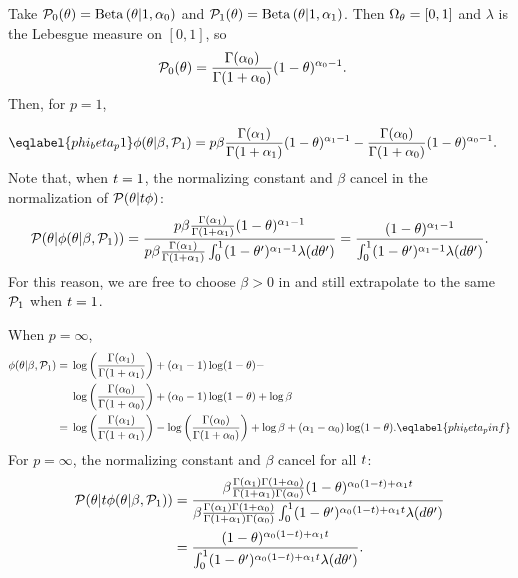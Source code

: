 \begin{ex}
%
Take $\mathcal{P}_{0}(\theta) = \mathrm{Beta}\left(\theta \vert 1, \alpha_0\right)$ and
$\mathcal{P}_{1}(\theta) = \mathrm{Beta}\left(\theta \vert 1, \alpha_1\right)$.  Then
$\Omega_{\theta}=[0,1]$ and $\lambda$ is the Lebesgue measure on $[0,1]$, so
%
\begin{align*}
%
\pbase(\theta) ={}&
    \frac{\Gamma(\alpha_0)}{\Gamma(1 + \alpha_0)} (1 - \theta)^{\alpha_0 - 1}.
%
\end{align*}
%
Then, for $p = 1$,

\begin{align}\eqlabel{phi_beta_p1}
%
\phi(\theta \vert \beta, \palt) ={}&
    p \beta \frac{\Gamma(\alpha_1)}{\Gamma(1 + \alpha_1)}
        (1 - \theta)^{\alpha_1 - 1} -
    \frac{\Gamma(\alpha_0)}{\Gamma(1 + \alpha_0)}
        (1 - \theta)^{\alpha_0 - 1}.
%
\end{align}
%
Note that, when $t = 1$, the normalizing constant and $\beta$ cancel in the
normalization of $\mathcal{P}(\theta \vert t \phi)$:
%
\begin{align*}
%
\p(\theta \vert \phi(\theta \vert \beta, \palt)) =
\frac{p \beta \frac{\Gamma(\alpha_1)}{\Gamma(1 + \alpha_1)}
        (1 - \theta)^{\alpha_1 - 1}}
     {p \beta \frac{\Gamma(\alpha_1)}{\Gamma(1 + \alpha_1)}
       \int_0^1 (1 - \theta')^{\alpha_1 - 1} \lambda(d\theta')}
=
\frac{(1 - \theta)^{\alpha_1 - 1}}
     {\int_0^1 (1 - \theta')^{\alpha_1 - 1} \lambda(d\theta')}.
%
\end{align*}
%
For this reason, we are free to choose $\beta > 0$ in 
and still extrapolate to the same $\mathcal{P}_{1}$ when $t = 1$.

When $p = \infty$,
%
\begin{align}
%
\phi(\theta \vert \beta, \palt) ={}&
    \log \left(
        \frac{\Gamma(\alpha_1) }{\Gamma(1 + \alpha_1)}
    \right)  + (\alpha_1 - 1) \log (1 - \theta) - \nonumber\\
{}&
    \log \left(
        \frac{\Gamma(\alpha_0)}{\Gamma(1 + \alpha_0)}
    \right) + (\alpha_0 - 1) \log (1 - \theta)  + \log \beta \nonumber\\
={}&
\log \left(
    \frac{\Gamma(\alpha_1) }{\Gamma(1 + \alpha_1)}
\right) -
\log \left(
    \frac{\Gamma(\alpha_0)}{\Gamma(1 + \alpha_0)}
\right) + \log \beta + (\alpha_1 - \alpha_0) \log(1 - \theta).
\eqlabel{phi_beta_pinf}
%
\end{align}
%
For $p = \infty$, the normalizing constant and $\beta$ cancel for all $t$:
%
\begin{align*}
%
\p(\theta \vert \t \phi(\theta \vert \beta, \palt)) ={}&
\frac{  \beta \frac{\Gamma(\alpha_1) \Gamma(1 + \alpha_0) }
                   {\Gamma(1 + \alpha_1) \Gamma(\alpha_0)}
        (1-\theta)^{\alpha_0 (1 - \t) + \alpha_1 \t}
    }
    {
        \beta \frac{\Gamma(\alpha_1) \Gamma(1 + \alpha_0) }
                   {\Gamma(1 + \alpha_1) \Gamma(\alpha_0)}
             \int_0^1 (1-\theta')^{\alpha_0 (1 - \t) +
                                   \alpha_1 \t} \lambda(d\theta')
     }
\\={}&
\frac{(1-\theta)^{\alpha_0 (1 - \t) + \alpha_1 \t}}
     {\int_0^1 (1-\theta')^{\alpha_0 (1 - \t) + \alpha_1 \t} \lambda(d\theta')}.
%
\end{align*}
%
\end{ex}


